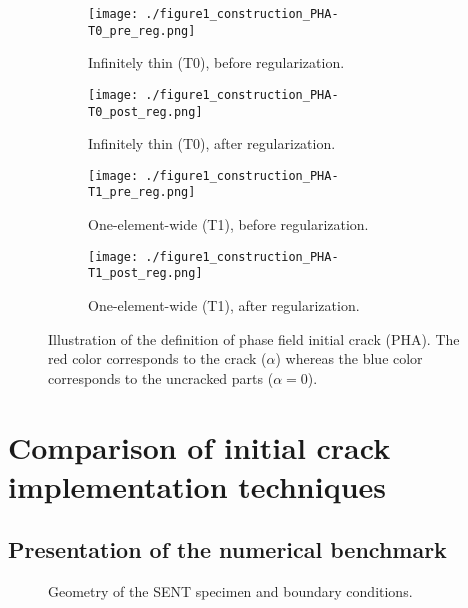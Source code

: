 \documentclass[OptSoft]{jtcam_preprint}
\begin{document}
\begin{figure}
  \centering
  \begin{subfigure}{0.49\textwidth}
    \centering
    \texttt{[image: ./figure1\_construction\_PHA-T0\_pre\_reg.png]}
    \caption{Infinitely thin (T0), before regularization.}
  \end{subfigure}
  \begin{subfigure}{0.49\textwidth}
    \centering
    \texttt{[image: ./figure1\_construction\_PHA-T0\_post\_reg.png]}
    \caption{Infinitely thin (T0), after regularization.}
    \label{fig:definition_initial_cracks_PHA_T0_post_reg}
  \end{subfigure}
  \begin{subfigure}{0.49\textwidth}
    \centering
    \texttt{[image: ./figure1\_construction\_PHA-T1\_pre\_reg.png]}
    \caption{One-element-wide (T1), before regularization.}
  \end{subfigure}
  \begin{subfigure}{0.49\textwidth}
    \centering
    \texttt{[image: ./figure1\_construction\_PHA-T1\_post\_reg.png]}
    \caption{One-element-wide (T1), after regularization.}
  \end{subfigure}
  \caption{Illustration of the definition of phase field initial crack (PHA). The red color corresponds to the crack ($\alpha$) whereas the blue color corresponds to the uncracked parts ($\alpha=0$).}
  \label{fig:definition_initial_cracks_PHA}
\end{figure}


\section{Comparison of initial crack implementation techniques}
\label{sec:comparison_crack_initialization_techniques}

\subsection{Presentation of the numerical benchmark}

\begin{figure}
  \centering
  
  \caption{Geometry of the SENT specimen and boundary conditions.}
  \label{fig:sent_specimen}
\end{figure}
\end{document}
